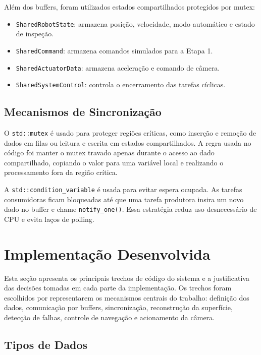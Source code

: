 \documentclass[12pt,a4paper]{article}
\begin{document}
    Além dos buffers, foram utilizados estados compartilhados protegidos por mutex:

    \begin{itemize}
        \item \texttt{SharedRobotState}: armazena posição, velocidade, modo automático e estado de inspeção.
        \item \texttt{SharedCommand}: armazena comandos simulados para a Etapa 1.
        \item \texttt{SharedActuatorData}: armazena aceleração e comando de câmera.
        \item \texttt{SharedSystemControl}: controla o encerramento das tarefas cíclicas.
    \end{itemize}

    \subsection{Mecanismos de Sincronização}

    O \texttt{std::mutex} é usado para proteger regiões críticas, como inserção e remoção de dados em filas ou leitura e escrita em estados compartilhados. A regra usada no código foi manter o mutex travado apenas durante o acesso ao dado compartilhado, copiando o valor para uma variável local e realizando o processamento fora da região crítica.

    A \texttt{std::condition\_variable} é usada para evitar espera ocupada. As tarefas consumidoras ficam bloqueadas até que uma tarefa produtora insira um novo dado no buffer e chame \texttt{notify\_one()}. Essa estratégia reduz uso desnecessário de CPU e evita laços de polling.

    \section{Implementação Desenvolvida}

    Esta seção apresenta os principais trechos de código do sistema e a justificativa das decisões tomadas em cada parte da implementação. Os trechos foram escolhidos por representarem os mecanismos centrais do trabalho: definição dos dados, comunicação por buffers, sincronização, reconstrução da superfície, detecção de falhas, controle de navegação e acionamento da câmera.

    \subsection{Tipos de Dados}
\end{document}
